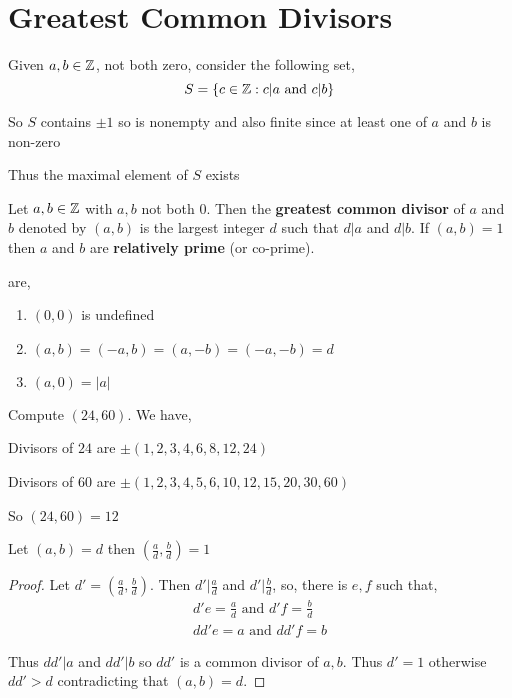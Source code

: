 \section{Greatest Common Divisors}

Given $a, b \in \mathbb{Z}$, not both zero, consider the following set,  
$$ S = \{c \in \mathbb{Z}: c | a \text{ and } c | b\} $$ 

So $S$ contains $\pm 1$ so is nonempty and also finite since at least one of  $a$ and $b$ is non-zero

Thus the maximal element  of $S$ exists 

\begin{definition}[GCD]
    Let $a, b \in \mathbb{Z}$ with $a,b$ not both $0$. Then the \textbf{greatest common divisor} of $a$ and $b$ denoted by $(a,b)$ is the largest integer $d$ such that  $d | a$ and  $d | b$. If $(a,b) = 1$ then  $a$ and  $b$ are \textbf{relatively prime} (or co-prime).
\end{definition}
\begin{remark}
    are, 
    \begin{enumerate}
        \item $(0, 0)$ is undefined 
        \item $(a, b) = (-a, b) = (a, -b) = (-a, -b) = d$
        \item $(a, 0) = |a|$
    \end{enumerate}
\end{remark}

\begin{eg}
    Compute $(24, 60)$. We have, 

    Divisors of $24$ are  $\pm (1, 2, 3, 4, 6, 8, 12, 24)$

    Divisors of $60$ are  $\pm (1, 2, 3, 4,5,  6,10, 12, 15, 20, 30, 60)$

    So $(24, 60) = 12$
\end{eg}

\begin{prop}
   Let $(a,b) = d$  then $(\frac{a}{d}, \frac{b}{d}) = 1$
\end{prop}
\begin{proof}
    Let $d'  = (\frac{a}{d}, \frac{b}{d})$. Then  $d' | \frac{a}{d}$ and $d' | \frac{b}{d}$, so, there is $e, f$ such that,  
    \begin{align*}
        d'e = \frac{a}{d} \text{ and } d'f = \frac{b}{d}\\
        dd'e = a \text{ and } dd'f = b
    \end{align*}

    Thus $dd' | a$ and  $dd' | b$ so  $dd'$ is a common divisor of  $a,b$. Thus  $d' = 1$ otherwise  $dd' > d$ contradicting that $(a, b) = d$.
\end{proof}


